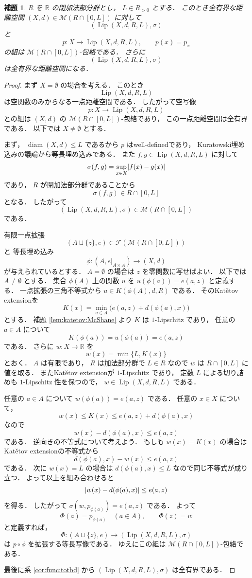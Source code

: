 \documentclass[leqno, 12pt]{jsarticle}
\newtheorem{lem}[thm]{補題}
\newcommand{\rr}{\mathbb{R}}
\DeclareMathOperator{\di}{diam}
\DeclareMathOperator{\lip}{Lip}
\DeclarePairedDelimiter{\abs}{\lvert}{\rvert}
\newcommand{\Met}[1]{\mathscr{M}(#1)}
\newcommand{\FinitePart}[1]{\mathscr{F}(#1)}
\newcommand{\FinMet}[1]{\FinitePart{\Met{#1}}}
\newcommand{\KatSpace}[3]{K(#1,#2,#3)}
\newcommand{\LipSpace}[4]{\lip(#1,#2,#3,#4)}
\newcommand{\LipDist}{\sigma}
\newcommand{\kura}[1]{p_{#1}}
\newcommand{\pospart}[1]{#1_{>0}}
\begin{document}
\begin{lem}\label{lem:func:Lenv}
$R$
を
$\rr$
の閉加法部分群とし，
$L\in\pospart{R}$
とする．
このとき全有界な距離空間
$(X, d)\in \Met{R\cap[0,L]}$
に対して
\[
(\LipSpace{X}{d}{R}{L}, \LipDist)
\]
と
\[
p\colon X\longrightarrow\LipSpace{X}{d}{R}{L},
\qquad
p(x)=\kura{x}
\]
の組は
$\Met{R\cap[0,L]}$-包絡である．
さらに
\[
(\LipSpace{X}{d}{R}{L}, \LipDist)
\]
は全有界な距離空間になる．
\end{lem}
\begin{proof}
まず
$X=\emptyset$
の場合を考える．
このとき
\[
\LipSpace{X}{d}{R}{L}
\]
は空関数のみからなる一点距離空間である．
したがって空写像
\[
p\colon X\longrightarrow\LipSpace{X}{d}{R}{L}
\]
との組は
$(X,d)$
の
$\Met{R\cap[0,L]}$-包絡であり，
この一点距離空間は全有界である．
以下では
$X\neq\emptyset$
とする．

まず，
$\di(X,d)\le L$
であるから
$p$
はwell-definedであり，
Kuratowski埋め込みの議論から等長埋め込みである．
また
$f,g\in\LipSpace{X}{d}{R}{L}$
に対して
\[
\LipDist(f,g)=\sup_{x\in X}\abs{f(x)-g(x)}
\]
であり，
$R$
が閉加法部分群であることから
\[
\LipDist(f,g)\in R\cap[0,L]
\]
となる．
したがって
\[
(\LipSpace{X}{d}{R}{L},\LipDist)
\in\Met{R\cap[0,L]}
\]
である．

有限一点拡張
\[
(A\sqcup\{z\},e)\in\FinMet{R\cap[0,L]}
\]
と
等長埋め込み
\[
\phi\colon(A,e|_{A\times A})\longrightarrow(X,d)
\]
が与えられているとする．
$A=\emptyset$
の場合は
$z$
を零関数に写せばよい．
以下では
$A\neq\emptyset$
とする．
集合
$\phi(A)$
上の関数
$u$
を
$u(\phi(a))=e(a,z)$
と定義する．
一点拡張の三角不等式から
$u\in\KatSpace{\phi(A)}{d}{R}$
である．
そのKat\v{e}tov extensionを
\[
K(x)=
\min_{a\in A}
\bigl(e(a,z)+d(\phi(a),x)\bigr)
\]
とする．
補題
\ref{lem:katetov:McShane}
より
$K$
は
$1$-Lipschitz
であり，
任意の
$a\in A$
について
\[
K(\phi(a))=u(\phi(a))=e(a,z)
\]
である．
さらに
$w\colon X\to \rr$
を
\[
w(x)=
\min\{L,K(x)\}
\]
とおく．
$A$
は有限であり，
$R$
は加法部分群で
$L\in R$
なので
$w$
は
$R\cap[0,L]$
に値を取る．
またKat\v{e}tov extensionが
$1$-Lipschitz
であり，
定数
$L$
による切り詰めも
$1$-Lipschitz
性を保つので，
$w\in\LipSpace{X}{d}{R}{L}$
である．

任意の
$a\in A$
について
$w(\phi(a))=e(a, z)$
である．
任意の
$x\in X$
について，
\[
w(x)\le K(x)
\le e(a,z)+d(\phi(a),x)
\]
なので
\[
w(x)-d(\phi(a),x)\le e(a,z)
\]
である．
逆向きの不等式について考えよう．
もしも
$w(x)=K(x)$
の場合はKat\v{e}tov extensionの不等式から
\[
d(\phi(a),x)-w(x)\le e(a,z)
\]
である．
次に
$w(x)=L$
の場合は
$d(\phi(a),x)\le L$
なので同じ不等式が成り立つ．
よって以上を組み合わせると
\[
\abs{w(x)-d(\phi(a),x)}
\le e(a,z)
\]
を得る．
したがって
$\LipDist(w,\kura{\phi(a)})=e(a,z)$
である．
よって
\[
\Phi(a)=\kura{\phi(a)}
\quad(a\in A),
\qquad
\Phi(z)=w
\]
と定義すれば，
\[
\Phi\colon
(A\sqcup\{z\},e)
\longrightarrow
(\LipSpace{X}{d}{R}{L},\LipDist)
\]
は
$p\circ\phi$
を拡張する等長写像である．
ゆえにこの組は
$\Met{R\cap[0,L]}$-包絡である．

最後に系
\ref{cor:func:totbd}
から
$(\LipSpace{X}{d}{R}{L},\LipDist)$
は全有界である．
\end{proof}
\end{document}
